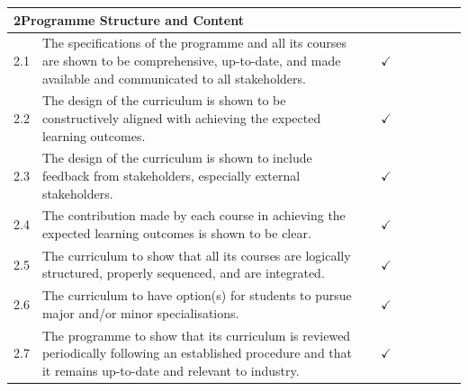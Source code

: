 \begin{longtable}{|p{0.6cm}|>{\raggedright\arraybackslash}p{9.2cm}|c|c|c|c|c|c|c|}
  \multicolumn{9}{|l|}{\cellcolor{gray!15}\textbf{2\quad Programme Structure and Content}} \\
  \hline
  2.1 & The specifications of the programme and all its courses are shown to be comprehensive, up-to-date, and made available and communicated to all stakeholders. & & $\checkmark$ & & & & & \\
  \hline
  2.2 & The design of the curriculum is shown to be constructively aligned with achieving the expected learning outcomes. & & $\checkmark$ & & & & & \\
  \hline
  2.3 & The design of the curriculum is shown to include feedback from stakeholders, especially external stakeholders. & & $\checkmark$ & & & & & \\
  \hline
  2.4 & The contribution made by each course in achieving the expected learning outcomes is shown to be clear. & & $\checkmark$ & & & & & \\
  \hline
  2.5 & The curriculum to show that all its courses are logically structured, properly sequenced, and are integrated. & & $\checkmark$ & & & & & \\
  \hline
  2.6 & The curriculum to have option(s) for students to pursue major and/or minor specialisations. & & $\checkmark$ & & & & & \\
  \hline
  2.7 & The programme to show that its curriculum is reviewed periodically following an established procedure and that it remains up-to-date and relevant to industry. & & $\checkmark$ & & & & & \\
  \hline


\end{longtable}
